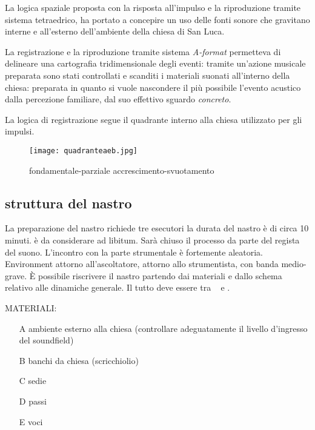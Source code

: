La logica spaziale proposta con la risposta all'impulso e la riproduzione tramite sistema
tetraedrico, ha portato a concepire un uso delle fonti sonore che gravitano interne e
all’esterno dell'ambiente della chiesa di San Luca.

La registrazione e la riproduzione tramite sistema \emph{A-format} permetteva di delineare una
cartografia tridimensionale degli eventi: tramite un'azione musicale preparata sono stati
controllati e scanditi i materiali suonati all'interno della chiesa: preparata in quanto
si vuole nascondere il più possibile l’evento acustico dalla percezione familiare, dal
suo effettivo sguardo \emph{concreto}.

La logica di registrazione segue il quadrante interno alla chiesa utilizzato per gli impulsi.



\begin{figure}[h]
\centering
{\texttt{[image: quadranteaeb.jpg]}}
\caption[Passaggio microtonale]{fondamentale-parziale accrescimento-svuotamento}
\label{fig:microtoni}
\end{figure}

\subsection{struttura del nastro}

La preparazione del nastro richiede tre esecutori                                                            
la durata del nastro è di circa 10 minuti.
è da considerare ad libitum. Sarà chiuso il processo da parte del regista del suono.
L'incontro con la parte strumentale è fortemente aleatoria. Environment attorno all’ascoltatore,
attorno allo strumentista, con banda medio-grave. È possibile riscrivere il nastro
partendo dai materiali e dallo schema relativo alle dinamiche generale. Il tutto deve
essere tra \ppp\ppp ~ e \pp .

\bigskip

MATERIALI:

\begin{enumerate}
	\item [A] ambiente esterno alla chiesa \newline (controllare adeguatamente il livello d'ingresso del soundfield)
	\item [B] banchi da chiesa (scricchiolio)
	\item [C] sedie
	\item [D] passi
	\item [E] voci
\end{enumerate}

